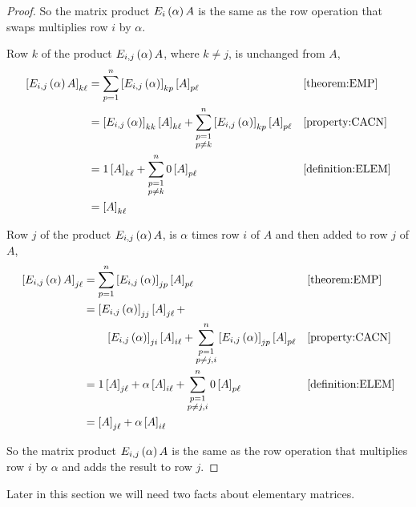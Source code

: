 \documentclass{ximera}
\begin{document}
\begin{theorem}
\begin{proof}
  So the matrix product $E_{i}\left(\alpha\right)A$ is the same as the row operation that swaps multiplies row $i$ by $\alpha$.

  Row $k$ of the product $E_{i,j}\left(\alpha\right)A$, where $k\neq j$, is unchanged from $A$,
  \begin{align*}
    \left\lbrack E_{i,j}\left(\alpha\right)A\right\rbrack_{k\ell}
    &=\sum_{p=1}^{n}\left\lbrack E_{i,j}\left(\alpha\right)\right\rbrack_{kp}\left\lbrack A\right\rbrack_{p\ell}
    &&\ref{theorem:EMP}\\
    &=\left\lbrack E_{i,j}\left(\alpha\right)\right\rbrack_{kk}\left\lbrack A\right\rbrack_{k\ell}+
      \sum_{\substack{p=1\\p\neq k}}^{n}\left\lbrack E_{i,j}\left(\alpha\right)\right\rbrack_{kp}\left\lbrack A\right\rbrack_{p\ell}
    &&\ref{property:CACN}\\
    &=1\left\lbrack A\right\rbrack_{k\ell}+\sum_{\substack{p=1\\p\neq k}}^{n}0\left\lbrack A\right\rbrack_{p\ell}
    &&\ref{definition:ELEM}\\
    &=\left\lbrack A\right\rbrack_{k\ell}
  \end{align*}

  Row $j$ of the product $E_{i,j}\left(\alpha\right)A$, is $\alpha$ times row $i$ of $A$ and then added to row $j$ of $A$,
  \begin{align*}
    \left\lbrack E_{i,j}\left(\alpha\right)A\right\rbrack_{j\ell}
    &=\sum_{p=1}^{n}\left\lbrack E_{i,j}\left(\alpha\right)\right\rbrack_{jp}\left\lbrack A\right\rbrack_{p\ell}
    &&\ref{theorem:EMP}\\
    &=\left\lbrack E_{i,j}\left(\alpha\right)\right\rbrack_{jj}\left\lbrack A\right\rbrack_{j\ell}+\\
    &\quad\quad\left\lbrack E_{i,j}\left(\alpha\right)\right\rbrack_{ji}\left\lbrack A\right\rbrack_{i\ell}+
      \sum_{\substack{p=1\\p\neq j,i}}^{n}\left\lbrack E_{i,j}\left(\alpha\right)\right\rbrack_{jp}\left\lbrack A\right\rbrack_{p\ell}
    &&\ref{property:CACN}\\
    &=1\left\lbrack A\right\rbrack_{j\ell}+\alpha\left\lbrack A\right\rbrack_{i\ell}+\sum_{\substack{p=1\\p\neq j,i}}^{n}0\left\lbrack A\right\rbrack_{p\ell}
    &&\ref{definition:ELEM}\\
    &=\left\lbrack A\right\rbrack_{j\ell}+\alpha\left\lbrack A\right\rbrack_{i\ell}
  \end{align*}

  So the matrix product $E_{i,j}\left(\alpha\right)A$ is the same as the
  row operation that multiplies row $i$ by $\alpha$ and adds the
  result to row $j$.
\end{proof}
\end{theorem}

Later in this section we will need two facts about elementary
matrices.
\end{document}
